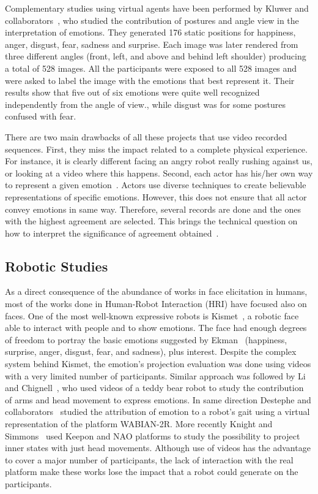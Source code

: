 Complementary studies using virtual agents have been performed by  Kluwer and collaborators~\cite{Kluwer2004}, who studied the contribution of postures and angle view in the interpretation of emotions. They generated 176 static positions for happiness, anger, disgust, fear, sadness and surprise. Each image was later rendered from three different angles (front, left, and above and behind left shoulder) producing a total of 528 images. All the participants were exposed to all 528 images and were asked to label the image with the emotions that best represent it. Their results show that five out of six emotions were quite well recognized independently from the angle of view., while disgust was for some postures confused with fear.

There are two main drawbacks of all these projects that use video recorded sequences. First, they miss the impact related to a complete physical experience. For instance, it is clearly different facing an angry robot really rushing against us, or looking at a video where this happens. Second, each actor has his/her own way to represent a given emotion~\cite{Russell2003,Gunes2011}. Actors use diverse techniques to create believable representations of specific emotions. However, this does not ensure that all actor convey emotions in same way. Therefore, several records are done and the ones with the highest agreement are selected. This brings the technical question on how to interpret the significance of agreement obtained~\cite{Russell2003}.

\subsection{Robotic Studies}
As a direct consequence of the abundance of works in face elicitation in humans, most of the works done in Human-Robot Interaction (HRI) have focused also on faces. One of the most well-known expressive robots is Kismet~\cite{Breazeal2002}, a robotic face able to interact with people and to show emotions. The face had enough degrees of freedom to portray the basic emotions suggested by Ekman~\cite{Ekman2004} (happiness, surprise, anger, disgust, fear, and sadness), plus interest. 
Despite the complex system behind Kismet, the emotion's projection evaluation was done using videos with a very limited number of participants. Similar approach was followed by Li and Chignell~\cite{Li2011}, who used videos of a teddy bear robot to study the contribution of arms and head movement to express emotions. In same direction Destephe and collaborators~\cite{Destephe2013b,Destephe2013} studied the attribution of emotion to a robot's gait using a virtual representation of the platform WABIAN-2R. More recently Knight and Simmons~\cite{knight2016} used Keepon and NAO platforms to study the possibility to project inner states with just head movements. Although use of videos has the advantage to cover a major number of participants, the lack of interaction with the real platform make these works lose the impact that a robot could generate on the participants.  

